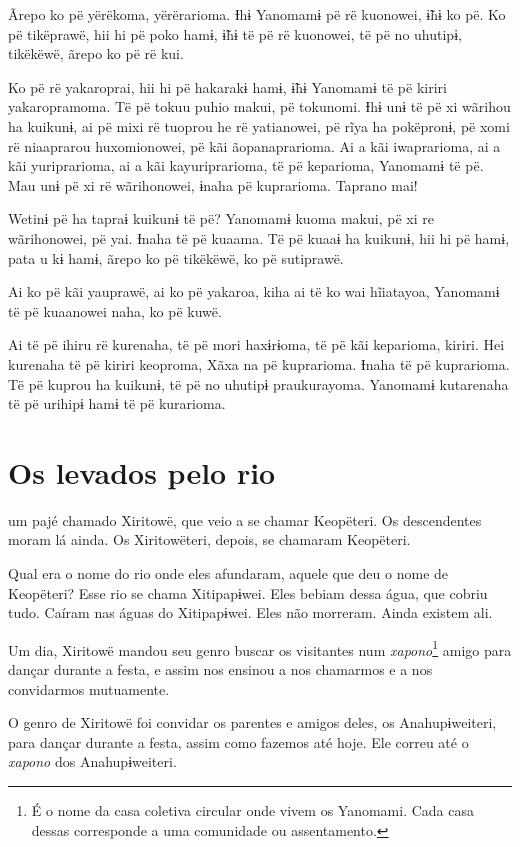 Ãrepo ko pë yërëkoma, yërërarioma. Ɨhɨ Yanomamɨ pë rë kuonowei, ɨ̃hɨ ko
pë. Ko pë tikëprawë, hii hi pë poko hamɨ, ɨ̃hɨ të pë rë kuonowei, të pë
no uhutipɨ, tikëkëwë, ãrepo ko pë rë kui. 

Ko pë rë yakaroprai, hii hi pë hakarakɨ hamɨ, ɨ̃hɨ Yanomamɨ të pë kiriri
yakaropramoma. Të pë tokuu puhio makui, pë tokunomi. Ɨhɨ unɨ të pë xi
wãrihou ha kuikunɨ, ai pë mixi rë tuoprou he rë yatianowei, pë rĩya ha
pokëpronɨ, pë xomi rë niaaprarou huxomionowei, pë kãi ãopanaprarioma. Ai
a kãi iwaprarioma, ai a kãi yuriprarioma, ai a kãi kayuriprarioma, të pë
keparioma, Yanomamɨ të pë. Mau unɨ pë xi rë wãrihonowei, ɨnaha pë
kuprarioma. Taprano mai! 

Wetinɨ pë ha tapraɨ kuikunɨ të pë? Yanomamɨ kuoma makui, pë xi re
wãrihonowei, pë yai. Ɨnaha të pë kuaama. Të pë kuaaɨ ha kuikunɨ, hii hi
pë hamɨ, pata u kɨ hamɨ, ãrepo ko pë tikëkëwë, ko pë sutiprawë. 

Ai ko pë kãi yauprawë, ai ko pë yakaroa, kiha ai të ko wai hĩiatayoa,
Yanomamɨ të pë kuaanowei naha, ko pë kuwë. 

Ai të pë ihiru rë kurenaha, të pë mori haxɨrɨoma, të pë kãi keparioma,
kiriri. Hei kurenaha të pë kiriri keoproma, Xãxa na pë kuprarioma. Ɨnaha
të pë kuprarioma. Të pë kuprou ha kuikunɨ, të pë no uhutipɨ
praukurayoma. Yanomamɨ kutarenaha të pë urihipɨ hamɨ të pë kurarioma.

\chapter{Os levados pelo rio}

 um pajé chamado Xiritowë, que veio a se chamar Keopëteri. Os
descendentes moram lá ainda. Os Xiritowëteri, depois, se chamaram
Keopëteri. 

Qual era o nome do rio onde eles afundaram, aquele que deu o nome de
Keopëteri? Esse rio se chama Xitipapɨwei. Eles bebiam dessa água, que
cobriu tudo. Caíram nas águas do Xitipapɨwei. Eles não morreram. Ainda
existem ali. 

Um dia, Xiritowë mandou seu genro buscar os visitantes
num \textit{xapono}\footnote{É o nome da casa coletiva circular onde vivem os Yanomami. Cada casa
dessas corresponde a uma comunidade ou assentamento.} amigo para dançar durante a festa, e assim
nos ensinou a nos chamarmos e a nos convidarmos mutuamente. 

O genro de Xiritowë foi convidar os parentes e amigos deles, os
Anahupɨweiteri, para dançar durante a festa, assim como fazemos até hoje.
Ele correu até o \textit{xapono} dos Anahupɨweiteri. 

